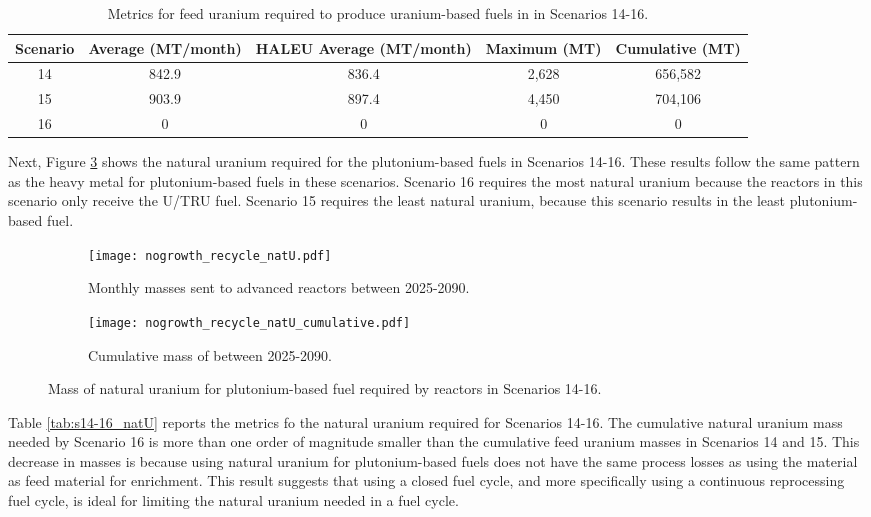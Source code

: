 \begin{table}[h!]
    \centering 
    \caption{Metrics for feed uranium required to produce 
    uranium-based fuels in in Scenarios 14-16.}
    \label{tab:s14-16_feed}
    \begin{tabular}{c c c c c}
        \hline 
        Scenario & Average (MT/month) & HALEU Average (MT/month) &
        Maximum (MT) & Cumulative (MT) \\
        \hline 
        14 & 842.9 & 836.4 & 2,628 & 656,582 \\
        15 & 903.9 & 897.4 & 4,450 & 704,106\\
        16 & 0 & 0 & 0 & 0\\
        \hline
        
    \end{tabular}
\end{table}

Next, Figure \ref{fig:nogrowth_recycle_natu} shows the natural 
uranium required for the plutonium-based fuels in Scenarios 14-16. 
These results follow the same pattern as the heavy metal for 
plutonium-based fuels in these scenarios. Scenario 16 requires 
the most natural uranium because the reactors in this scenario 
only receive the U/TRU fuel. Scenario 15 requires the least 
natural uranium, because this scenario results in the least 
plutonium-based fuel.

\begin{figure}[h!]
    \centering
    \begin{subfigure}[b]{0.45\textwidth}
        \centering
        \texttt{[image: nogrowth\_recycle\_natU.pdf]}
        \caption{Monthly masses sent to 
        advanced reactors between 2025-2090.}
        \label{fig:nogrowth_recycle_AR_natu}
    \end{subfigure}
    \hfill
    \begin{subfigure}[b]{0.45\textwidth}
        \centering
        \texttt{[image: nogrowth\_recycle\_natU\_cumulative.pdf]}
        \caption{Cumulative mass of between 2025-2090.}
        \label{fig:nogrowth_recycle_natu_cumulative}
    \end{subfigure}
       \caption{Mass of natural uranium for plutonium-based fuel required 
       by reactors
        in Scenarios 14-16.}
       \label{fig:nogrowth_recycle_natu}
\end{figure}

Table \ref{tab:s14-16_natU} reports the metrics fo the natural uranium 
required for Scenarios 14-16. The cumulative natural uranium mass 
needed by Scenario 16 is more than one order of magnitude smaller than 
the cumulative feed uranium masses in Scenarios 14 and 15. This 
decrease in masses is because using natural uranium for plutonium-based 
fuels does not have the same process losses as using the 
material as feed material for enrichment. This result suggests that 
using a closed fuel cycle, and more specifically using a continuous 
reprocessing fuel cycle, is ideal for limiting the natural uranium 
needed in a fuel cycle. 

